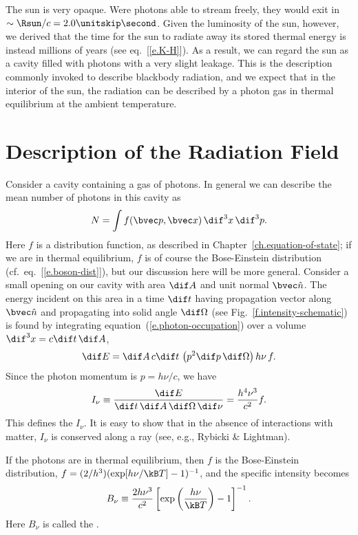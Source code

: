 
The sun is very opaque.  Were photons able to stream freely, they would exit in $\sim \Rsun/c = 2.0\nsp\second$.  Given the luminosity of the sun, however, we derived that the time  for the sun to radiate away its stored thermal energy is instead millions of years (see eq.~[\ref{e.K-H}]).  As a result, we can regard the sun as a cavity filled with photons with a very slight leakage.  This is the description commonly invoked to describe blackbody radiation, and we expect that in the interior of the sun, the radiation can be described by a photon gas in thermal equilibrium at the ambient temperature.

\section{Description of the Radiation Field}\label{s.radiation-description}

Consider a cavity containing a gas of photons. In general we can describe the mean number of photons in this cavity as
\begin{equation}\label{e.photon-occupation}
 N = \int f(\vp,\vx)\,\dif^{3}x\,\dif^{3}p.
\end{equation}
Here $f$ is a distribution function, as described in Chapter~\ref{ch.equation-of-state}; if we are in thermal equilibrium, $f$ is of course the Bose-Einstein distribution (cf.\ eq.~[\ref{e.boson-dist}]), but our discussion here will be more general.  Consider a small opening on our cavity with area $\dif A$ and unit normal $\unitn$.  The energy incident on this area in a time $\dif t$ having propagation vector along $\unitn$ and propagating into solid angle $\dif\Omega$ (see Fig.~\ref{f.intensity-schematic}) is found by integrating equation~(\ref{e.photon-occupation}) over a volume $\dif^{3}x = c\dif t\,\dif A$,
\[
\dif E = \dif A\,c\dif t\,\left( p^{2}\dif p\,\dif\Omega\right)  h\nu \, f.
\]
Since the photon momentum is $p = h\nu/c$, we have
\begin{equation}\label{e.specific-intensity}
I_{\nu} \equiv \frac{\dif E}{\dif t\,\dif A\,\dif\Omega\,\dif\nu} = \frac{h^{4}\nu^{3}}{c^{2}} f.
\end{equation}
This defines the  $I_{\nu}$.  It is easy to show that in the absence of interactions with matter, $I_{\nu}$ is conserved along a ray (see, e.g., Rybicki \& Lightman).

If the photons are in thermal equilibrium, then $f$ is the Bose-Einstein distribution, $f = (2/h^{3})(\exp[h\nu/\kB T]-1)^{-1}$, and the specific intensity becomes
\begin{equation}\label{e.Bnu}
B_{\nu} \equiv \frac{2 h\nu^{3}}{c^{2}} \left[\exp\left(\frac{h\nu}{\kB T}\right)-1\right]^{-1}.
\end{equation}
Here $B_{\nu}$ is called the .

